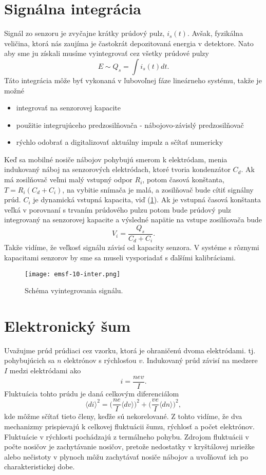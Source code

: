 \documentclass[../../main.tex]{subfiles}
\begin{document}
\section{Signálna integrácia}
Signál zo senzoru je zvyčajne krátky prúdový pulz, $i_s(t)$. Avšak, fyzikálna veličina, ktorá nás zaujíma je častokrát depozitovaná energia v detektore. Nato aby sme ju získali musíme vyintegrovať cez všetky prúdové pulzy
$$ E \sim Q_s = \int i_s(t)dt.$$
Táto integrácia môže byť vykonaná v ľubovoľnej fáze lineárneho systému, takže je možné
\begin{itemize}
\item integrovať na senzorovej kapacite
\item použitie integrujúceho predzosilňovača - nábojovo-závislý predzosilňovač
\item rýchlo odobrať a digitalizovať aktuálny impulz a sčítať numericky
\end{itemize}

Keď sa mobilné nosiče nábojov pohybujú smerom k elektródam, menia indukovaný náboj na senzorových elektródach, ktoré tvoria kondenzátor $C_d$. Ak má zosilňovač veľmi malý vstupný odpor $R_i$, potom časová konštanta, $T = R_i(C_d+C_i)$, na vybitie snímača je malá, a zosilňovač bude cítiť signálny prúd. $C_i$ je dynamická vstupná kapacita, viď (\ref{em10:fig:inter}). Ak je vstupná časová konštanta veľká v porovnaní s trvaním prúdového pulzu potom bude prúdový pulz integrovaný na senzorovej kapacite a výsledné napätie na vstupe zosilňovača bude
$$ V_i = \frac{Q_s}{C_d + C_i}. $$ Takže vidíme, že veľkosť signálu závisí od kapacity senzora. V systéme s rôznymi kapacitami senzorov by sme sa museli vysporiadať s ďalšími kalibráciami. 

\begin{figure}[!h]
\texttt{[image: emsf-10-inter.png]}
\centering
\caption{Schéma vyintegrovania signálu.}
\label{em10:fig:inter}
\end{figure}

\section{Elektronický šum}
Uvažujme prúd prúdiaci cez vzorku, ktorá je ohraničenú dvoma elektródami. tj. pohybujúcich sa $n$ elektrónov s rýchlosťou $v$. Indukovaný prúd závisí na medzere $I$ medzi elektródami ako 
$$ i = \frac{nev}{I}.$$
Fluktuácia tohto prúdu je daná celkovým diferenciálom
$$ \langle di \rangle^2 = \bigg( \frac{ne}{I} \langle dv \rangle  \bigg)^2 + \bigg( \frac{ve}{I} \langle dn \rangle  \bigg)^2,$$
kde môžme sčítať tieto členy, keďže sú nekorelované. Z tohto vidíme, že dva mechanizmy prispievajú k celkovej fluktuácii šumu, rýchlosť a počet elektrónov. Fluktuácie v rýchlosti pochádzajú z termálneho pohybu. Zdrojom fluktuácii v počte nosičov je zachytávanie nosičov, pretože nedostatky v kryštálovej mriežke alebo nečistoty v plynoch môžu zachytávať nosiče nábojov a uvoľňovať ich po charakteristickej dobe.
\end{document}
